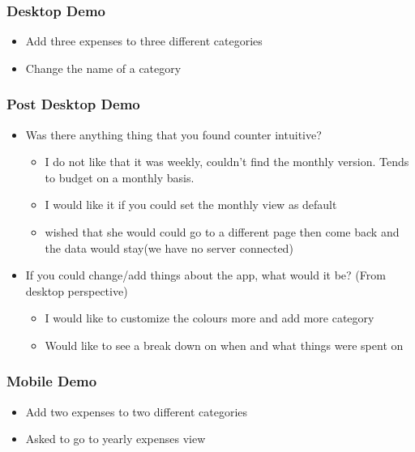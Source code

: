 \documentclass{chi2011}
\begin{document}
\begin{itemize}[noitemsep]
	\subsubsection{Desktop Demo}
	\begin{itemize}[noitemsep] 
		\item Add three expenses to three different categories
		\item Change the name of a category
	\end{itemize}
	
	\subsubsection{Post Desktop Demo}
	\begin{itemize}[noitemsep]
		\item Was there anything thing that you found counter intuitive?
		\begin{itemize}[noitemsep]
			\item I do not like that it was weekly, couldn't find the monthly version. Tends to
			 budget on a monthly basis. 
			\item I would like it if you could set the monthly view as default
			\item wished that she would could go to a different page then come back and the
			data would stay(we have no server connected)
		\end{itemize}
		\item If you could change/add things about the app, what would it be? (From desktop perspective)
		\begin{itemize}[noitemsep]
				\item I would like to customize the colours more and add more
					category
				\item  Would like to see a break down on when and what things were spent on
		\end{itemize}
	\end{itemize}
	
	\subsubsection{Mobile Demo}
	\begin{itemize}[noitemsep] 
		\item Add two expenses to two different categories
		\item Asked to go to yearly expenses view
	\end{itemize}


\end{itemize}
\end{document}
